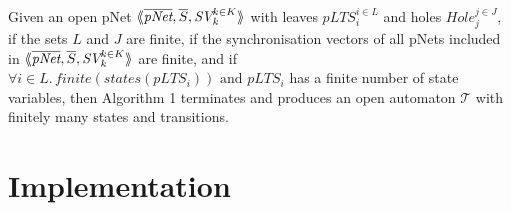 \documentclass{lncs/llncs}
\begin{document}
\begin{theorem}\\
Given an open pNet $\mylangle \overline{\pNet},\overline{S}, \symb{SV}_k^{k\in K}\myrangle$ with leaves $pLTS_i^{i\in L}$ and holes $Hole_j^{j\in
  J}$, if the sets $L$ and $J$ are finite, if the synchronisation vectors of all pNets 
  included in  $\mylangle \overline{\pNet},\overline{S}, \symb{SV}_k^{k\in K}\myrangle$ 
  are finite, and if
$\forall i \in L.\, finite{(states(pLTS_i))} \text{ and } pLTS_i$
has a finite number of state variables, then Algorithm 1 terminates
and produces an open automaton 
$\mathcal{T}$ with finitely many states and transitions.




\end{theorem}

\section{Implementation}
\end{document}
